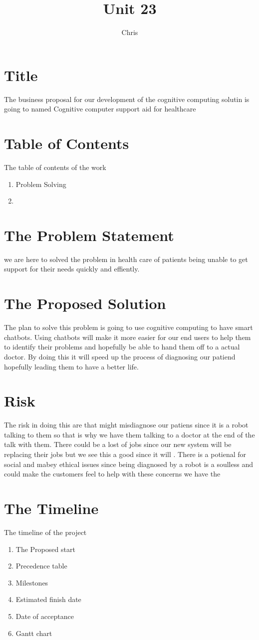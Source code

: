 \documentclass{article}
\title{Unit 23}
\author{Chris}
\date{}
\begin{document}
\section{Title}
The business proposal for our development of the cognitive computing solutin is going to named 
Cognitive computer support aid for healthcare

\section{Table of Contents}
The table of contents of the work
\begin{enumerate}
	\item	Problem Solving
	\item	
\end{enumerate}

\section{The Problem Statement}
we are here to solved the problem in health care of patients being unable to get support for their needs quickly and effiently.

\section{The Proposed Solution}
The plan to solve this problem is going to use cognitive computing to have smart chatbots. Using chatbots will make it more easier for our end users to help them to identify their problems and hopefully be able to hand them off to a actual doctor. By doing this it will speed up the process of diagnosing our patiend hopefully leading them to have a better life.

\section{Risk}
The risk in doing this are that might misdiagnose our patiens since it is a robot talking to them so that is why we have them talking to a doctor at the end of the talk with them. There could be a lost of jobs since our new system will be replacing their jobs but we see this a good since it will   . 
There is a potienal for social and mabey ethical issues since being diagnosed by a robot is a soulless and could make the customers feel to help with these concerns we have the 

\section{The Timeline}
The timeline of the project
\begin{enumerate}
	\item The Proposed start
	\item Precedence table
	\item Milestones
	\item Estimated finish date
	\item Date of acceptance 
	\item Gantt chart
\end{enumerate}
\end{document}
